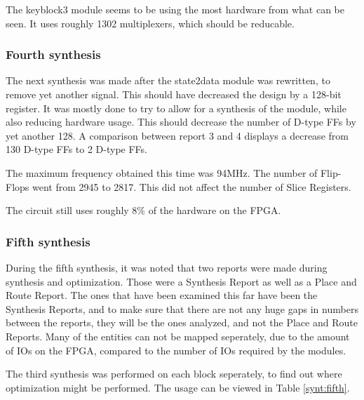 The keyblock3 module seems to be using the most hardware from what can 
be seen. It uses roughly 1302 multiplexers, which should be reducable.

\subsubsection{Fourth synthesis}
The next synthesis was made after the state2data module was rewritten, 
to remove yet another signal. This should have decreased the design by 
a 128-bit register. It was mostly done to try to allow for a synthesis 
of the module, while also reducing hardware usage. This should decrease 
the number of D-type FFs by yet another 128. A comparison between 
report 3 and 4 displays a decrease from 130 D-type FFs to 2 D-type FFs.

The maximum frequency obtained this time was 94MHz. The number of 
Flip-Flops went from 2945 to 2817. This did not affect the number of 
Slice Registers.

The circuit still uses roughly 8\% of the hardware on the FPGA.

\subsubsection{Fifth synthesis}
During the fifth synthesis, it was noted that two reports were made 
during synthesis and optimization. Those were a Synthesis Report as 
well as a Place and Route Report. The ones that have been examined 
this far have been the Synthesis Reports, and to make sure that 
there are not any huge gaps in numbers between the reports, they will 
be the ones analyzed, and not the Place and Route Reports. Many of the 
entities can not be mapped seperately, due to the amount of IOs on the 
FPGA, compared to the number of IOs required by the modules.

The third synthesis was performed on each block seperately, to find out
where optimization might be performed. The usage can be viewed in Table 
\ref{synt:fifth}.

%
\newcommand{\MyIndent}{\hspace*{0.2cm}}%

